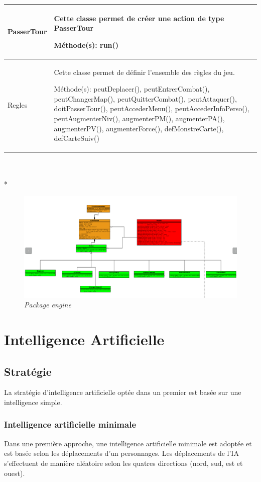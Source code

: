 \documentclass[11pt, a4paper]{article}
\begin{document}
\begin{tabularx}{\textwidth}{ |l|X| }
 PasserTour & Cette classe permet de créer une action de type PasserTour
 
Méthode(s): run()
  \\
\hline

    Regles & Cette classe permet de définir l'ensemble des règles du jeu.
    
Méthode(s): peutDeplacer(), peutEntrerCombat(), peutChangerMap(), peutQuitterCombat(), peutAttaquer(), doitPasserTour(), peutAccederMenu(), peutAccederInfoPerso(), peutAugmenterNiv(), augmenterPM(), augmenterPA(), augmenterPV(), augmenterForce(), defMonstreCarte(), defCarteSuiv()
  \\
\hline

\end{tabularx}\\ \\*

\begin{figure}[H]
  \centering
  \includegraphics[scale=0.35]{img/engine.png}
  \caption{\emph{Package engine}}
\end{figure}

\newpage

\section{Intelligence Artificielle}
\subsection{Stratégie}
La stratégie d'intelligence artificielle optée dans un premier est basée sur une intelligence simple.
\subsubsection{Intelligence artificielle minimale}
Dans une première approche, une intelligence artificielle minimale est adoptée et est basée selon les déplacements d'un personnages. Les déplacements de l'IA s'effectuent de manière aléatoire selon les quatres directions (nord, sud, est et ouest).
\end{document}
